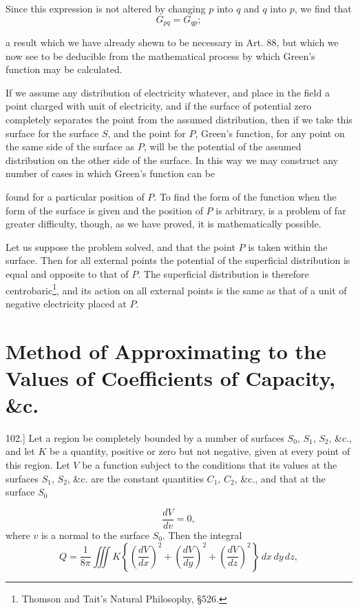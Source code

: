 \documentclass[11pt,a4paper]{article}
\begin{document}
Since this expression is not altered by changing $p$ into $q$ and $q$ into $p$, we find that
\begin{equation}\tag{6}
G_{pq}=G_{qp};
\end{equation}

a result which we have already shewn to be necessary in Art. 88, but which we now see to be deducible from the mathematical process by which Green's function may be calculated.

If we assume any distribution of electricity whatever, and place in the field a point charged with unit of electricity, and if the surface of potential zero completely separates the point from the assumed distribution, then if we take this surface for the surface $S$, and the point for $P$, Green's function, for any point on the same side of the surface as $P$, will be the potential of the assumed distribution on the other side of the surface. In this way we may construct any number of cases in which Green's function can be

found for a particular position of $P$. To find the form of the function when the form of the surface is given and the position of $P$ is arbitrary, is a problem of far greater difficulty, though, as we have proved, it is mathematically possible.

Let us suppose the problem solved, and that the point $P$ is taken within the surface. Then for all external points the potential of the superficial distribution is equal and opposite to that of $P$. The superficial distribution is therefore centrobaric\footnote{Thomson and Tait's Natural Philosophy, \S 526.}, and its action on all external points is the same as that of a unit of negative electricity placed at $P$.

\section*{Method of Approximating to the Values of Coefficients of Capacity, \&c.}

102.] Let a region be completely bounded by a number of surfaces $S_0$, $S_1$, $S_2$, \&c., and let $K$ be a quantity, positive or zero but not negative, given at every point of this region. Let $V$ be a function subject to the conditions that its values at the surfaces $S_1$, $S_2$, \&c. are the constant quantities $C_1$, $C_2$, \&c., and that at the surface $S_0$

\begin{equation}\tag{1}
\frac{dV}{dv}=0,
\end{equation}
where $v$ is a normal to the surface $S_0$. Then the integral
\begin{equation}\tag{2}
Q = \frac{1}{8\pi} \iiint K \left\{\left(\frac{dV}{dx}\right)^2 + \left(\frac{dV}{dy}\right)^2 + \left(\frac{dV}{dz}\right)^2\right\}\,dx\,dy\,dz,
\end{equation}
\end{document}
